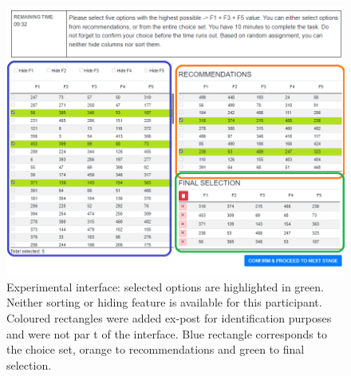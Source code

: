 \documentclass[a4paper,12pt]{article}
\begin{document}
\begin{figure}
\begin{center}    \includegraphics[width=0.99\linewidth]{staticFiles/EDITEDexperimentScreenFULL.png}
    \caption{Experimental interface: selected options are highlighted in green. Neither sorting or hiding feature is available for this participant. Coloured rectangles were added ex-post for identification purposes and were not par t of the interface. Blue rectangle corresponds to the choice set, orange to recommendations and green to final selection. }
    \label{fig:experimentInterface}
\end{center}
\end{figure}
\end{document}
